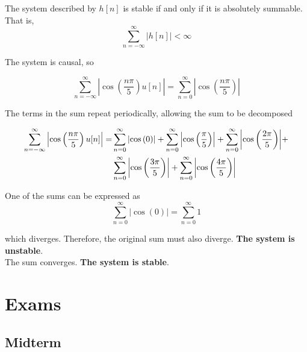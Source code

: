 The system described by $h[n]$ is stable if and only if it is absolutely summable. That is,
\begin{equation}
\sum\limits_{n =  - \infty }^\infty  {\left| {h[n]} \right| < \infty } 
\end{equation}

The system is causal, so

\begin{equation}
\sum\limits_{n =  - \infty }^\infty  {\left| {\cos \left( {\frac{{n\pi }}{5}} \right)u[n]} \right|}  = \sum\limits_{n = 0}^\infty  {\left| {\cos \left( {\frac{{n\pi }}{5}} \right)} \right|} 
\end{equation}

The terms in the sum repeat periodically, allowing the sum to be decomposed

\begin{equation}
\begin{aligned}
\sum\limits_{n =  - \infty }^\infty  {\left| {\cos \left( {\frac{{n\pi }}{5}} \right)u[n]} \right|}  =& \sum\limits_{n = 0}^\infty  {\left| {\cos \left( 0 \right)} \right|}  + \sum\limits_{n = 0}^\infty  {\left| {\cos \left( {\frac{\pi }{5}} \right)} \right|}  + \sum\limits_{n = 0}^\infty  {\left| {\cos \left( {\frac{{2\pi }}{5}} \right)} \right|}  + \hfill \\
&\sum\limits_{n = 0}^\infty  {\left| {\cos \left( {\frac{{3\pi }}{5}} \right)} \right|}  + \sum\limits_{n = 0}^\infty  {\left| {\cos \left( {\frac{{4\pi }}{5}} \right)} \right|} \hfill \\
\end{aligned}
\end{equation}

One of the sums can be expressed as
\begin{equation}
\sum\limits_{n = 0}^\infty  {\left| {\cos \left( 0 \right)} \right|}  = \sum\limits_{n = 0}^\infty  1 
\end{equation}

which diverges. Therefore, the original sum must also diverge. \textbf{The system is unstable}.
\\ 
The sum converges. \textbf{The system is stable}.

\section{Exams}

\subsection{Midterm}

